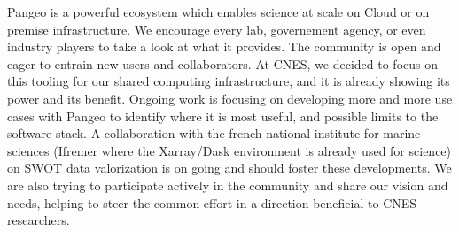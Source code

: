 \documentclass{article}
\begin{document}
Pangeo is a powerful ecosystem which enables science at scale on Cloud or on premise infrastructure. We encourage every lab, governement agency, or even industry players to take a look at what it provides. The community is open and eager to entrain new users and collaborators.
At CNES, we decided to focus on this tooling for our shared computing infrastructure, and it is already showing its power and its benefit. Ongoing work is focusing on developing more and more use cases with Pangeo to identify where it is most useful, and possible limits to the software stack. A collaboration with the french national institute for marine sciences (Ifremer where the Xarray/Dask environment is already used for science\cite{b9}) on SWOT data valorization is on going and should foster these developments. We are also trying to participate  actively in the community and share our vision and needs, helping to steer the common effort in a direction beneficial to CNES researchers.







\small
\end{document}
